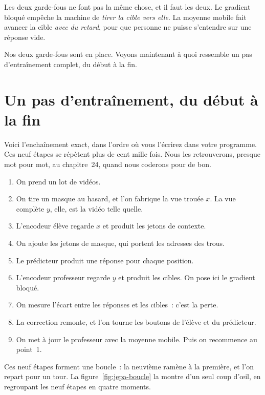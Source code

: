\begin{aretenir}
Les deux garde-fous ne font pas la même chose, et il faut les deux. Le
gradient bloqué empêche la machine de \emph{tirer la cible vers elle}. La
moyenne mobile fait avancer la cible \emph{avec du retard}, pour que
personne ne puisse s'entendre sur une réponse vide.
\end{aretenir}

Nos deux garde-fous sont en place. Voyons maintenant à quoi ressemble un
pas d'entraînement complet, du début à la fin.

\section{Un pas d'entraînement, du début à la fin}

Voici l'enchaînement exact, dans l'ordre où vous l'écrirez dans votre
programme. Ces neuf étapes se répètent plus de cent mille fois. Nous les
retrouverons, presque mot pour mot, au chapitre~24, quand nous coderons pour
de bon.

\begin{enumerate}
  \item On prend un lot de vidéos.
  \item On tire un masque au hasard, et l'on fabrique la vue trouée $x$. La
        vue complète $y$, elle, est la vidéo telle quelle.
  \item L'encodeur élève regarde $x$ et produit les jetons de contexte.
  \item On ajoute les jetons de masque, qui portent les adresses des trous.
  \item Le prédicteur produit une réponse pour chaque position.
  \item L'encodeur professeur regarde $y$ et produit les cibles. On pose ici
        le gradient bloqué.
  \item On mesure l'écart entre les réponses et les cibles~: c'est la perte.
  \item La correction remonte, et l'on tourne les boutons de l'élève et du
        prédicteur.
  \item On met à jour le professeur avec la moyenne mobile. Puis on
        recommence au point~1.
\end{enumerate}

Ces neuf étapes forment une boucle~: la neuvième ramène à la première, et
l'on repart pour un tour. La figure~\ref{fig:jepa-boucle} la montre d'un
seul coup d'œil, en regroupant les neuf étapes en quatre moments.

